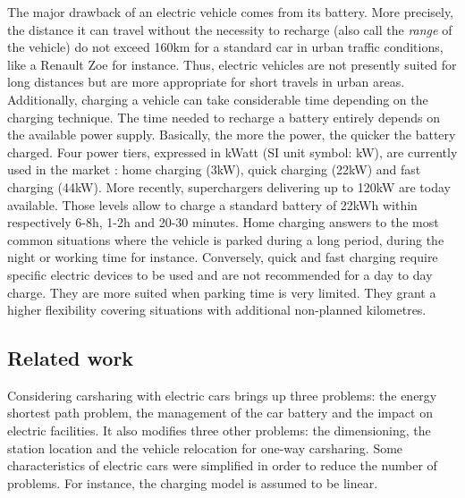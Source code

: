 \begin{bibunit}[ieeetr]
\medskip
The major drawback of an electric vehicle comes from its battery.
More precisely, the distance it can travel without the necessity to recharge (also call the \emph{range} of the vehicle) do not exceed 160km for a standard car in urban traffic conditions, like a Renault Zoe for instance.
Thus, electric vehicles are not presently suited for long distances but are more appropriate for short travels in urban areas.
Additionally, charging a vehicle can take considerable time depending on the charging technique.
The time needed to recharge a battery entirely depends on the available power supply.
Basically, the more the power, the quicker the battery charged.
Four power tiers, expressed in kWatt (SI unit symbol: kW), are currently used in the market \cite{livre_vert_2014}: home charging (3kW), quick charging (22kW) and fast charging (44kW).
More recently, superchargers delivering up to 120kW are today available.
Those levels allow to charge a standard battery of 22kWh within respectively 6-8h, 1-2h and 20-30 minutes.
Home charging answers to the most common situations where the vehicle is parked during a long period, during the night or working time for instance.
Conversely, quick and fast charging require specific electric devices to be used and are not recommended for a day to day charge.
They are more suited when parking time is very limited.
They grant a higher flexibility covering situations with additional non-planned kilometres.

\subsection{Related work}
Considering carsharing with electric cars brings up three problems: the energy shortest path problem, the management of the car battery and the impact on electric facilities.
It also modifies three other problems: the dimensioning, the station location and the vehicle relocation for one-way carsharing.
Some characteristics of electric cars were simplified in order to reduce the number of problems.
For instance, the charging model is assumed to be linear.


\end{bibunit}
